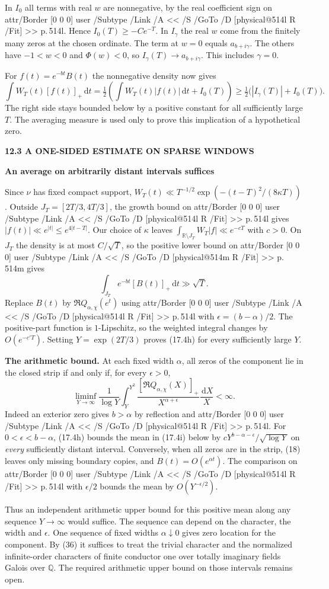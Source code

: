 \documentclass[11pt,letterpaper]{article}
\makeatletter
\newcommand{\rightmarktext}{}
\newcommand{\printfolio}{}
\newcommand{\leaf}[4]{\clearpage\gdef\printfolio{#1}\gdef\rightmarktext{#2}%
  {\small\sffamily\bfseries\color{ink}#3\par}\vspace{3pt}%
  {\LARGE\bfseries #4\par}\vspace{5pt}}
\newcommand{\point}[1]{\par\smallskip\textbf{#1.}\enspace\ignorespaces}
\newcommand{\R}{\mathbb R}
\newcommand{\Q}{\mathbb Q}
\newcommand{\dd}{\,\mathrm d}
\newcommand{\MusicPDFPageRef}[1]{\pdfpageref\csname physical@#1\endcsname\space\space 0 R}
\newcommand{\pagelink}[2]{\leavevmode\pdfstartlink attr{/Border [0 0 0]} user{%
  /Subtype /Link /A << /S /GoTo /D [\MusicPDFPageRef{#1} /Fit] >>}%
  {\color{ink}#2}\pdfendlink}
\newcommand{\pg}[1]{\pagelink{#1}{p.\,#1}}
\makeatother
\begin{document}
In $I_0$ all terms with real $w$ are nonnegative, by the real
coefficient sign on \pg{514l}. Hence $I_0(T)\ge-C e^{-T}$.
In $I_\gamma$ the real $w$ come from the finitely many zeros at the
chosen ordinate. The term at $w=0$ equals $a_{b+i\gamma}$.
The others have $-1<w<0$ and $\Phi(w)<0$, so
$I_\gamma(T)\to a_{b+i\gamma}$. This includes $\gamma=0$.

For $f(t)=e^{-bt}B(t)$ the nonnegative density now gives
\[
 \int W_T(t)[f(t)]_+\dd t
   =\tfrac12\left(\int W_T(t)|f(t)|\dd t+ I_0(T)\right)
   \ge \tfrac12\bigl(|I_\gamma(T)|+I_0(T)\bigr).
\]
The right side stays bounded below by a positive constant for all
sufficiently large $T$. The averaging measure is used only to prove
this implication of a hypothetical zero.

\leaf{514n}{The remaining arithmetic estimate}{12.3 \quad A ONE-SIDED ESTIMATE ON SPARSE WINDOWS}{An average on arbitrarily distant intervals suffices}
Since $\nu$ has fixed compact support,
$W_T(t)\ll T^{-1/2}\exp(-(t-T)^2/(8\kappa T))$.
Outside $J_T=[2T/3,4T/3]$, the growth bound on \pg{514l} gives
$|f(t)|\ll e^{|t|}\le e^{4|t-T|}$. Our choice of $\kappa$ leaves
$\int_{\R\setminus J_T}W_T|f|\ll e^{-cT}$ with $c>0$.
On $J_T$ the density is at most $C/\sqrt T$, so the positive lower
bound on \pg{514m} gives
\[
                   \int_{J_T} e^{-bt}[B(t)]_+\dd t\gg\sqrt T .
\]
Replace $B(t)$ by $\Re Q_{\alpha,\chi}(e^t)$ using \pg{514l} with
$\epsilon=(b-\alpha)/2$. The positive-part function is
$1$-Lipschitz, so the weighted integral changes by $O(e^{-c'T})$.
Setting $Y=\exp(2T/3)$ proves (17.4h) for every sufficiently large $Y$.

\point{The arithmetic bound}
At each fixed width $\alpha$, all zeros of the component lie in the
closed strip if and only if, for every $\epsilon>0$,
\[
 \liminf_{Y\to\infty}
 \frac1{\log Y}\int_Y^{Y^2}
      \frac{[\Re Q_{\alpha,\chi}(X)]_+}{X^{\alpha+\epsilon}}
          \frac{\dd X}{X}<\infty .
 \tag{17.4i}
\]
Indeed an exterior zero gives $b>\alpha$ by reflection and
\pg{514l}. For $0<\epsilon<b-\alpha$, (17.4h) bounds the mean in
(17.4i) below by $cY^{b-\alpha-\epsilon}/\sqrt{\log Y}$ on
\emph{every} sufficiently distant interval. Conversely, when all
zeros are in the strip, (18) leaves only missing boundary copies,
and $B(t)=O(e^{\alpha t})$. The comparison on \pg{514l} with
$\epsilon/2$ bounds the mean by $O(Y^{-\epsilon/2})$.

Thus an independent arithmetic upper bound for this positive mean
along any sequence $Y\to\infty$ would suffice. The sequence can
depend on the character, the width and $\epsilon$. One sequence of
fixed widths $\alpha\downarrow0$ gives zero location for the
component. By (36) it suffices to treat the trivial character and
the normalized infinite-order characters of finite conductor one over
totally imaginary fields Galois over $\Q$. The required arithmetic
upper bound on those intervals remains open.
\end{document}
